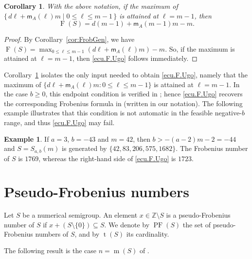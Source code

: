 \documentclass[12pt,a4paper]{amsart}
\newtheorem{corollary}[theorem]{Corollary}
\theoremstyle{definition}
\newtheorem{example}[theorem]{Example}
\begin{document}
\begin{corollary}\label{cor:F_at_m-1}
With the above notation, if the maximum of $\{\,d\ell+\mathsf{m}_A(\ell)m \mid 0\le \ell\le m-1\,\}$ is attained at $\ell=m-1$, then
\begin{equation}\label{ecu.F.Ugo}
\operatorname{F}(S)=d(m-1)+\mathsf{m}_A(m-1)m-m.
\end{equation}
\end{corollary}

\begin{proof}
By Corollary~\ref{cor:FrobGen}, we have $\operatorname{F}(S)=\max_{0\le \ell\le m-1}\left(d\ell+\mathsf{m}_A(\ell)m\right)-m$. So, if the maximum is attained at $\ell=m-1$, then \eqref{ecu.F.Ugo} follows immediately.
\end{proof}

Corollary~\ref{cor:F_at_m-1} isolates the only input needed to obtain \eqref{ecu.F.Ugo}, namely that the maximum of
$\{d\ell+\mathsf{m}_A(\ell)m:0\le \ell\le m-1\}$ is attained at $\ell=m-1$.
In the case $b\ge 0$, this endpoint condition is verified in \cite[Theorem~3.4(3)]{Ugo17}; hence \eqref{ecu.F.Ugo} recovers the
corresponding Frobenius formula in \cite{Ugo17} (written in our notation). The following example illustrates that this condition is not
automatic in the feasible negative-$b$ range, and thus \eqref{ecu.F.Ugo} may fail.

\begin{example}
If $a=3$, $b=-43$ and $m=42$, then $b>-(a-2)m-2=-44$ and $S=S_{a,b}(m)$ is generated by $\{42,83,206,575,1682\}$.
The Frobenius number of $S$ is $1769$, whereas the right-hand side of \eqref{ecu.F.Ugo} is $1723$.
\end{example}

\section{Pseudo-Frobenius numbers}\label{sec:PF}

Let $S$ be a numerical semigroup. An element
$x\in\mathbb{Z}\setminus S$ is a pseudo-Frobenius number of $S$ if
$x+(S\setminus\{0\})\subseteq S$. We denote by $\operatorname{PF}(S)$
the set of pseudo-Frobenius numbers of $S$, and by $\operatorname{t}(S)$
its cardinality.

The following result is the case $n=\operatorname{m}(S)$ of
\cite[Proposition~2.20]{libro}.
\end{document}
